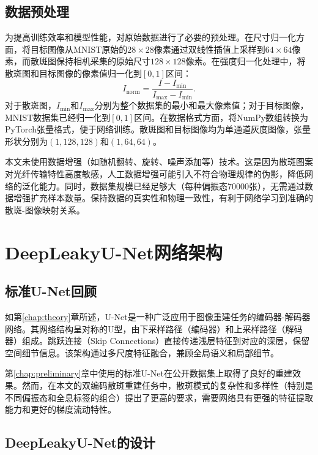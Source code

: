 {\subsection{数据预处理}\label{sec:data_preprocessing}

为提高训练效率和模型性能，对原始数据进行了必要的预处理。在尺寸归一化方面，将目标图像从MNIST原始的$28\times28$像素通过双线性插值上采样到$64\times64$像素，而散斑图保持相机采集的原始尺寸$128\times128$像素。在强度归一化处理中，将散斑图和目标图像的像素值归一化到$[0, 1]$区间：
\begin{equation}
I_{\text{norm}} = \frac{I - I_{\min}}{I_{\max} - I_{\min}}.
\end{equation}
对于散斑图，$I_{\min}$和$I_{\max}$分别为整个数据集的最小和最大像素值；对于目标图像，MNIST数据集已经归一化到$[0, 1]$区间。在数据格式方面，将NumPy数组转换为PyTorch张量格式，便于网络训练。散斑图和目标图像均为单通道灰度图像，张量形状分别为$(1, 128, 128)$和$(1, 64, 64)$。

本文未使用数据增强（如随机翻转、旋转、噪声添加等）技术。这是因为散斑图案对光纤传输特性高度敏感，人工数据增强可能引入不符合物理规律的伪影，降低网络的泛化能力。同时，数据集规模已经足够大（每种偏振态70000张），无需通过数据增强扩充样本数量。保持数据的真实性和物理一致性，有利于网络学习到准确的散斑-图像映射关系。

\section{DeepLeakyU-Net网络架构}\label{sec:dlu_net}

\subsection{标准U-Net回顾}\label{sec:standard_unet}

如第\ref{chap:theory}章所述，U-Net是一种广泛应用于图像重建任务的编码器-解码器网络。其网络结构呈对称的U型，由下采样路径（编码器）和上采样路径（解码器）组成。跳跃连接（Skip Connections）直接传递浅层特征到对应的深层，保留空间细节信息。该架构通过多尺度特征融合，兼顾全局语义和局部细节。

第\ref{chap:preliminary}章中使用的标准U-Net在公开数据集上取得了良好的重建效果。然而，在本文的双编码散斑重建任务中，散斑模式的复杂性和多样性（特别是不同偏振态和全息标签的组合）提出了更高的要求，需要网络具有更强的特征提取能力和更好的梯度流动特性。

\subsection{DeepLeakyU-Net的设计}\label{sec:dlu_motivation}

}
